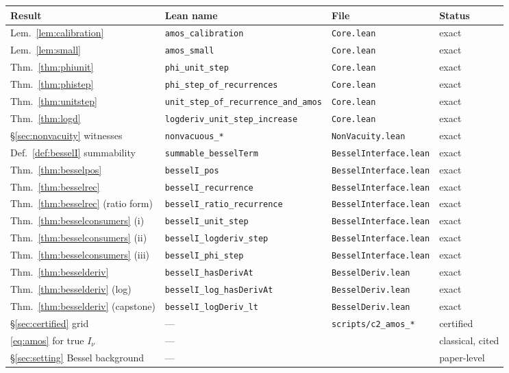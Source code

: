 \documentclass[11pt]{article}
\newcommand{\lean}[1]{\texttt{#1}}
\begin{document}
\begin{center}
\footnotesize
\begin{tabular}{@{}llll@{}}
\toprule
Result & Lean name & File & Status \\
\midrule
Lem.~\ref{lem:calibration} & \lean{amos\_calibration} & \lean{Core.lean} & exact \\
Lem.~\ref{lem:small} & \lean{amos\_small} & \lean{Core.lean} & exact \\
Thm.~\ref{thm:phiunit} & \lean{phi\_unit\_step} & \lean{Core.lean} & exact \\
Thm.~\ref{thm:phistep} & \lean{phi\_step\_of\_recurrences} & \lean{Core.lean} & exact \\
Thm.~\ref{thm:unitstep} & \lean{unit\_step\_of\_recurrence\_and\_amos} & \lean{Core.lean} & exact \\
Thm.~\ref{thm:logd} & \lean{logderiv\_unit\_step\_increase} & \lean{Core.lean} & exact \\
\S\ref{sec:nonvacuity} witnesses & \lean{nonvacuous\_*} & \lean{NonVacuity.lean} & exact \\
Def.~\ref{def:besselI} summability & \lean{summable\_besselTerm} & \lean{BesselInterface.lean} & exact \\
Thm.~\ref{thm:besselpos} & \lean{besselI\_pos} & \lean{BesselInterface.lean} & exact \\
Thm.~\ref{thm:besselrec} & \lean{besselI\_recurrence} & \lean{BesselInterface.lean} & exact \\
Thm.~\ref{thm:besselrec} (ratio form) & \lean{besselI\_ratio\_recurrence} & \lean{BesselInterface.lean} & exact \\
Thm.~\ref{thm:besselconsumers} (i) & \lean{besselI\_unit\_step} & \lean{BesselInterface.lean} & exact \\
Thm.~\ref{thm:besselconsumers} (ii) & \lean{besselI\_logderiv\_step} & \lean{BesselInterface.lean} & exact \\
Thm.~\ref{thm:besselconsumers} (iii) & \lean{besselI\_phi\_step} & \lean{BesselInterface.lean} & exact \\
Thm.~\ref{thm:besselderiv} & \lean{besselI\_hasDerivAt} & \lean{BesselDeriv.lean} & exact \\
Thm.~\ref{thm:besselderiv} (log) & \lean{besselI\_log\_hasDerivAt} & \lean{BesselDeriv.lean} & exact \\
Thm.~\ref{thm:besselderiv} (capstone) & \lean{besselI\_logDeriv\_lt} & \lean{BesselDeriv.lean} & exact \\
\S\ref{sec:certified} grid & --- & \lean{scripts/c2\_amos\_*} & certified \\
\eqref{eq:amos} for true $I_\nu$ & --- & \cite{Amos74,Segura11,RS16} & classical, cited \\
\S\ref{sec:setting} Bessel background & --- & \cite{DLMF} & paper-level \\
\bottomrule
\end{tabular}
\end{center}
\end{document}
